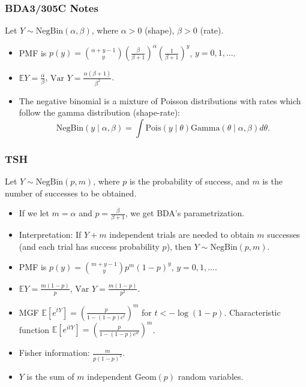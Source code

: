 \documentclass[twoside]{article}
\newcommand{\dis}{\displaystyle}
\newcommand\bbE{\mathbb{E}}
\def\t{\theta}
\newcommand\var{\text{Var }}
\begin{document}
\subsubsection*{BDA3/305C Notes}
Let $Y \sim \text{NegBin}(\alpha, \beta)$, where $\alpha > 0$ (shape), $\beta > 0$ (rate).
\begin{itemize}
\item PMF is $p(y) = \dis\binom{\alpha + y - 1}{y}\left(\frac{\beta}{\beta + 1}\right)^\alpha\left(\frac{1}{\beta + 1}\right)^y$, $y = 0, 1, \dots$.

\item $\bbE Y = \dis\frac{\alpha}{\beta}$, $\var Y = \dis\frac{\alpha(\beta+1)}{\beta^2}$.

\item The negative binomial is a mixture of Poisson distributions with rates which follow the gamma distribution (shape-rate):
\begin{equation*}
\text{NegBin}(y \mid \alpha, \beta) = \int \text{Pois}(y \mid \t) \text{Gamma}(\t \mid \alpha, \beta) d\t.
\end{equation*}
\end{itemize}

\subsubsection*{TSH}
Let $Y \sim \text{NegBin}(p,m)$, where $p$ is the probability of success, and $m$ is the number of successes to be obtained.
\begin{itemize}
\item If we let $m = \alpha$ and $p = \dis\frac{\beta}{\beta+1}$, we get BDA's parametrization.

\item Interpretation: If $Y+m$ independent trials are needed to obtain $m$ successes (and each trial has success probability $p$), then $Y \sim \text{NegBin}(p,m)$.

\item PMF is $p(y) = \dis\binom{m + y - 1}{y}p^m(1-p)^y$, $y = 0, 1, \dots$.

\item $\bbE Y = \dis\frac{m(1-p)}{p}$, $\var Y = \dis\frac{m(1-p)}{p^2}$.

\item MGF $\bbE[e^{tY}] = \left(\dis\frac{p}{1-(1-p)e^t}\right)^m$ for $t < - \log (1-p)$. Characteristic function $\bbE[e^{itY}] = \left(\dis\frac{p}{1-(1-p)e^{it}}\right)^m$.

\item Fisher information: $\dis\frac{m}{p(1-p)^2}$.

\item $Y$ is the sum of $m$ independent $\text{Geom}(p)$ random variables.
\end{itemize}
\end{document}
